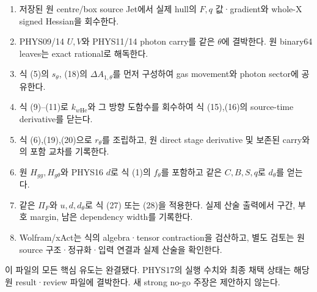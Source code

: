 \begin{enumerate}
\def\labelenumi{\arabic{enumi}.}
\tightlist
\item
  저장된 원 centre/box source Jet에서 실제 hull의 \(F,q\) 값·gradient와 whole-X signed Hessian을 회수한다.
\item
  PHYS09/14 \(U,V\)와 PHYS11/14 photon carry를 같은 \(\theta\)에 결박한다. 원 binary64 leaves는 exact rational로 해독한다.
\item
  식 (5)의 \(s_\theta\), (18)의 \(\Delta A_{1,\theta}\)를 먼저 구성하여 gas movement와 photon sector에 공유한다.
\item
  식 (9)--(11)로 \(k_{w\mathrm{He}}\)와 그 방향 도함수를 회수하여 식 (15),(16)의 source-time derivative를 닫는다.
\item
  식 (6),(19),(20)으로 \(r_\theta\)를 조립하고, 원 direct stage derivative 및 보존된 carry와의 포함 교차를 기록한다.
\item
  원 \(H_{gg},H_{g\theta}\)와 PHYS16 \(d\)로 식 (1)의 \(f_\theta\)를 포함하고 같은 \(C,B,S,q\)로 \(d_\theta\)를 얻는다.
\item
  같은 \(\Pi_F\)와 \(u,d,d_\theta\)로 식 (27) 또는 (28)을 적용한다. 실제 산술 출력에서 구간, 부호 margin, 남은 dependency width를 기록한다.
\item
  Wolfram/xAct는 식의 algebra·tensor contraction을 검산하고, 별도 검토는 원 source 구조·정규화·입력 연결과 실제 산술을 확인한다.
\end{enumerate}

이 파일의 모든 핵심 유도는 완결됐다. PHYS17의 실행 수치와 최종 채택 상태는 해당 원 result·review 파일에 결박한다. 새 strong no-go 주장은 제안하지 않는다.
